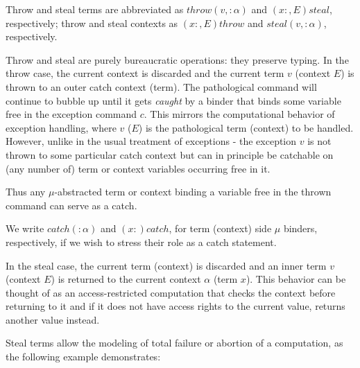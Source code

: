 \documentclass{IOS-Book-Article}
\begin{document}
\begin{notation}
  Throw and steal terms are abbreviated as $throw(v,:\alpha)$ and $(x:,E)steal$, respectively; throw and steal contexts as $(x:,E)throw$ and $steal(v, :\alpha)$, respectively.
\end{notation}

Throw and steal are purely bureaucratic operations: they preserve typing.
In the throw case, the current context is discarded and the current term $v$ (context $E$) is thrown to an outer catch context (term). The pathological command will continue to bubble up until it gets \emph{caught} by a binder that binds some variable free in the exception command $c$. This mirrors the computational behavior of exception handling, where $v$ ($E$) is the pathological term (context) to be handled. However, unlike in the usual treatment of exceptions - the exception $v$ is not thrown to some particular catch context but can in principle be catchable on (any number of) term or context variables occurring free in it.

Thus any \(\mu\)-abstracted term or context binding a variable free in the thrown command can serve as a catch.

\begin{notation}[Catch]
  We write $catch(:\alpha)$ and $(x:)catch$, for term (context) side $\mu$ binders, respectively, if we wish to stress their role as a catch statement.
\end{notation}

In the steal case, the current term (context) is discarded and an inner term $v$ (context $E$) is returned to the current context $\alpha$ (term $x$). This behavior can be thought of as an access-restricted computation that checks the context before returning to it and if it does not have access rights to the current value, returns another value instead.

Steal terms allow the modeling of total failure or abortion of a computation, as the following example demonstrates:
\end{document}
